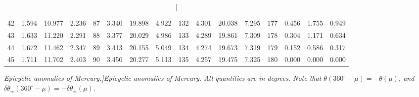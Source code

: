 \begin{table}
{\begin{tabular}{rrrr|rrrr|rrrr|rrrr}
 42 & \tiny{  1.594} &  10.977 & \tiny{  2.236} &  87 & \tiny{  3.340} &  19.898 & \tiny{  4.922} & 132 & \tiny{  4.301} &  20.038 & \tiny{  7.295} & 177 & \tiny{  0.456} &   1.755 & \tiny{  0.949}\\
 43 & \tiny{  1.633} &  11.220 & \tiny{  2.291} &  88 & \tiny{  3.377} &  20.029 & \tiny{  4.986} & 133 & \tiny{  4.289} &  19.861 & \tiny{  7.309} & 178 & \tiny{  0.304} &   1.171 & \tiny{  0.634}\\
 44 & \tiny{  1.672} &  11.462 & \tiny{  2.347} &  89 & \tiny{  3.413} &  20.155 & \tiny{  5.049} & 134 & \tiny{  4.274} &  19.673 & \tiny{  7.319} & 179 & \tiny{  0.152} &   0.586 & \tiny{  0.317}\\
 45 & \tiny{  1.711} &  11.702 & \tiny{  2.403} &  90 & \tiny{  3.450} &  20.277 & \tiny{  5.113} & 135 & \tiny{  4.257} &  19.475 & \tiny{  7.325} & 180 & \tiny{  0.000} &   0.000 & \tiny{  0.000}\\
\end{tabular}}
\caption[\em Epicyclic anomalies of Mercury.]{\em Epicyclic anomalies of Mercury. All quantities are in degrees. Note that $\bar{\theta}(360^\circ-\mu) = -\bar{\theta}(\mu)$, and $\delta\theta_{\pm}(360^\circ-\mu) = -\delta\theta_{\pm}(\mu)$. }\label{vt22}
\end{table}


